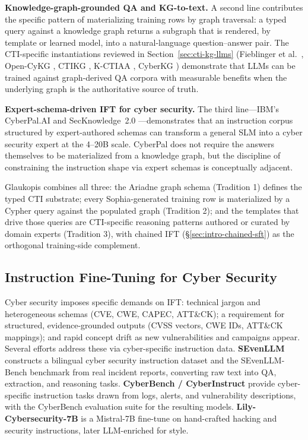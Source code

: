 \documentclass[conference]{IEEEtran}
\begin{document}
\textbf{Knowledge-graph-grounded QA and KG-to-text.} A second line contributes the specific pattern of materializing training rows by graph traversal: a typed query against a knowledge graph returns a subgraph that is rendered, by template or learned model, into a natural-language question--answer pair. The CTI-specific instantiations reviewed in Section~\ref{sec:cti-kg-llms} (Fieblinger et al.\ \cite{fieblinger2024kg}, Open-CyKG \cite{wu2022opencykg}, CTIKG \cite{yu2024ctikg}, K-CTIAA \cite{zhao2024kctiaa}, CyberKG \cite{zhang2023cyberkg}) demonstrate that LLMs can be trained against graph-derived QA corpora with measurable benefits when the underlying graph is the authoritative source of truth.

\textbf{Expert-schema-driven IFT for cyber security.} The third line---IBM's CyberPal.AI \cite{levi2024cyberpal} and SecKnowledge~2.0 \cite{levi2025toward}---demonstrates that an instruction corpus structured by expert-authored schemas can transform a general SLM into a cyber security expert at the 4--20B scale. CyberPal does not require the answers themselves to be materialized from a knowledge graph, but the discipline of constraining the instruction shape via expert schemas is conceptually adjacent.

Glaukopis combines all three: the Ariadne graph schema (Tradition 1) defines the typed CTI substrate; every Sophia-generated training row is materialized by a Cypher query against the populated graph (Tradition 2); and the templates that drive those queries are CTI-specific reasoning patterns authored or curated by domain experts (Tradition 3), with chained IFT (\S\ref{sec:intro-chained-sft}) as the orthogonal training-side complement.

\subsection{Instruction Fine-Tuning for Cyber Security}
\label{sec:ift-cyber}

Cyber security imposes specific demands on IFT: technical jargon and heterogeneous schemas (CVE, CWE, CAPEC, ATT\&CK); a requirement for structured, evidence-grounded outputs (CVSS vectors, CWE IDs, ATT\&CK mappings); and rapid concept drift as new vulnerabilities and campaigns appear. Several efforts address these via cyber-specific instruction data. \textbf{SEvenLLM} \cite{ji2024sevenllm} constructs a bilingual cyber security instruction dataset and the SEvenLLM-Bench benchmark from real incident reports, converting raw text into QA, extraction, and reasoning tasks. \textbf{CyberBench / CyberInstruct} \cite{liu2024cyberbench} provide cyber-specific instruction tasks drawn from logs, alerts, and vulnerability descriptions, with the CyberBench evaluation suite for the resulting models. \textbf{Lily-Cybersecurity-7B} \cite{liu2024cyberbench} is a Mistral-7B fine-tune on hand-crafted hacking and security instructions, later LLM-enriched for style.
\end{document}
